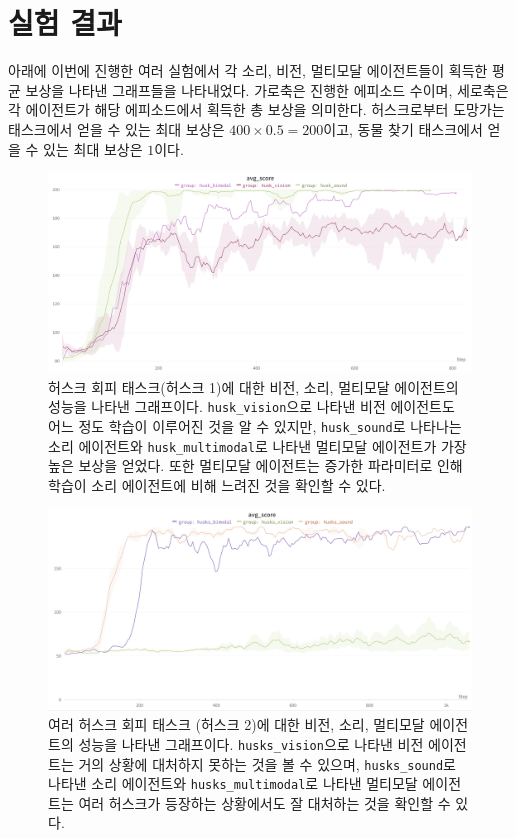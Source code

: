 \documentclass[oneside, under, ko]{snuthesis}
\begin{document}
\chapter{실험 결과}
아래에 이번에 진행한 여러 실험에서 각 소리, 비전, 멀티모달 에이전트들이 획득한 평균 보상을 나타낸 그래프들을 나타내었다. 가로축은 진행한 에피소드 수이며, 세로축은 각 에이전트가 해당 에피소드에서 획득한 총 보상을 의미한다. 허스크로부터 도망가는 태스크에서 얻을 수 있는 최대 보상은 $400 \times 0.5 = 200 $이고, 동물 찾기 태스크에서 얻을 수 있는 최대 보상은 $1$이다.
\begin{figure}[H]
    \centering
    \includegraphics[width=\textwidth]{husk.png}
    \caption{허스크 회피 태스크(허스크 1)에 대한 비전, 소리, 멀티모달 에이전트의 성능을 나타낸 그래프이다. \lstinline{husk_vision}으로 나타낸 비전 에이전트도 어느 정도 학습이 이루어진 것을 알 수 있지만, \lstinline{husk_sound}로 나타나는 소리 에이전트와 \lstinline{husk_multimodal}로 나타낸 멀티모달 에이전트가 가장 높은 보상을 얻었다. 또한 멀티모달 에이전트는 증가한 파라미터로 인해 학습이 소리 에이전트에 비해 느려진 것을 확인할 수 있다.}
    \label{fig:husk}
\end{figure}
\begin{figure}
    \centering
    \includegraphics[width=\textwidth]{husks.png}
    \caption{여러 허스크 회피 태스크 (허스크 2)에 대한 비전, 소리, 멀티모달 에이전트의 성능을 나타낸 그래프이다. \lstinline{husks_vision}으로 나타낸 비전 에이전트는 거의 상황에 대처하지 못하는 것을 볼 수 있으며, \lstinline{husks_sound}로 나타낸 소리 에이전트와 \lstinline{husks_multimodal}로 나타낸 멀티모달 에이전트는 여러 허스크가 등장하는 상황에서도 잘 대처하는 것을 확인할 수 있다.}
    \label{fig:husks}
\end{figure}
\end{document}
